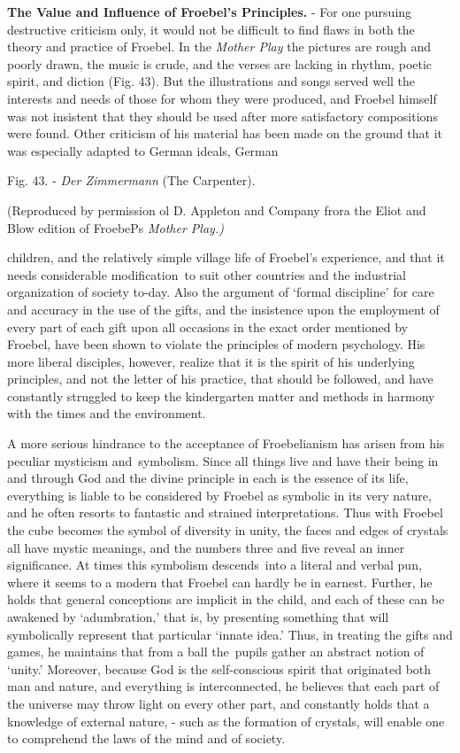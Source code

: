 \documentclass[]{book}
\begin{document}
\textbf{The Value and Influence of Froebel's Principles.} - For one pursuing destructive criticism only, it would not be difficult to find flaws in both the theory and practice of Froebel. In the \emph{Mother Play} the pictures are rough and poorly drawn, the music is crude, and the verses are lacking in rhythm, poetic spirit, and diction (Fig. 43). But the illustrations and songs served well the interests and needs of those for whom they were produced, and Froebel himself was not insistent that they should be used after more satisfactory compositions were found. Other criticism of his material has been made on the ground that it was especially adapted to German ideals, German

Fig. 43. - \emph{Der Zimmermann} (The Carpenter).

(Reproduced by permission ol D. Appleton and Company frora the Eliot and Blow edition of FroebePs \emph{Mother Play.)}

children, and the relatively simple village life of Froebel's experience, and that it needs considerable modification~to suit other countries and the industrial organization of society to-day. Also the argument of `formal discipline' for care and accuracy in the use of the gifts, and the insistence upon the employment of every part of each gift upon all occasions in the exact order mentioned by Froebel, have been shown to violate the principles of modern psychology. His more liberal disciples, however, realize that it is the spirit of his underlying principles, and not the letter of his practice, that should be followed, and have constantly struggled to keep the kindergarten matter and methods in harmony with the times and the environment.

A more serious hindrance to the acceptance of Froebelianism has arisen from his peculiar mysticism and~symbolism. Since all things live and have their being in and through God and the divine principle in each is the essence of its life, everything is liable to be considered by Froebel as symbolic in its very nature, and he often resorts to fantastic and strained interpretations. Thus with Froebel the cube becomes the symbol of diversity in unity, the faces and edges of crystals all have mystic meanings, and the numbers three and five reveal an inner significance. At times this symbolism descends~into a literal and verbal pun, where it seems to a modern that Froebel can hardly be in earnest. Further, he holds that general conceptions are implicit in the child, and each of these can be awakened by `adumbration,' that is, by presenting something that will symbolically represent that particular `innate idea.' Thus, in treating the gifts and games, he maintains that from a ball the~pupils gather an abstract notion of `unity.' Moreover, because God is the self-conscious spirit that originated both man and nature, and everything is interconnected, he believes that each part of the universe may throw light on every other part, and constantly holds that a knowledge of external nature, - such as the formation of crystals, will enable one to comprehend the laws of the mind and of society.
\end{document}
